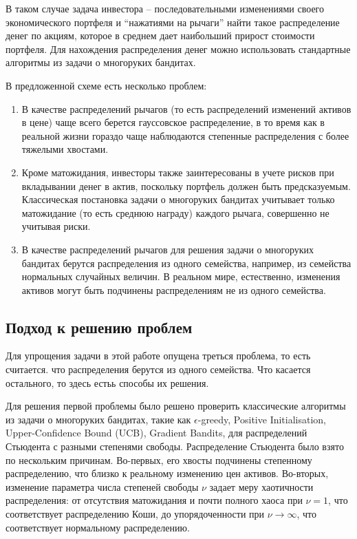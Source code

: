 В таком случае задача инвестора -- последовательными изменениями своего экономического портфеля и  ``нажатиями на рычаги'' найти такое распределение денег по акциям, которое в среднем дает наибольший прирост стоимости портфеля. Для нахождения распределения денег можно использовать стандартные алгоритмы из задачи о многоруких бандитах.

В предложенной схеме есть несколько проблем:
\begin{enumerate}
    \item В качестве распределений рычагов (то есть распределений изменений активов в цене) чаще всего берется гауссовское распределение, в то время как в реальной жизни гораздо чаще наблюдаются степенные распределения с более тяжелыми хвостами.
    \item Кроме матожидания, инвесторы также заинтересованы в учете рисков при вкладывании денег в актив, поскольку портфель должен быть предсказуемым. Классическая постановка задачи о многоруких бандитах учитывает только матожидание (то есть среднюю награду) каждого рычага, совершенно не учитывая риски.
    \item В качестве распределений рычагов для решения задачи о многоруких бандитах берутся распределения из одного семейства, например, из семейства нормальных случайных величин. В реальном мире, естественно, изменения активов могут быть подчинены распределениям не из одного семейства.
\end{enumerate}

\subsection{Подход к решению проблем}

Для упрощения задачи в этой работе опущена треться проблема, то есть считается. что распределения берутся из одного семейства. Что касается остального, то здесь естьь способы их решения.

Для решения первой проблемы было решено проверить классические алгоритмы из задачи о многоруких бандитах, такие как $\epsilon$-greedy, Positive Initialisation, Upper-Confidence Bound (UCB), Gradient Bandits, для распределений Стьюдента с разными степенями свободы. Распределение Стьюдента было взято по нескольким причинам. Во-первых, его хвосты подчинены степенному распределению, что близко к реальному изменению цен активов. Во-вторых, изменение параметра числа степеней свободы $\nu$ задает меру хаотичности распределения: от отсутствия матожидания и почти полного хаоса при $\nu=1$, что соответствует распределению Коши, до упорядоченности при $\nu \to \infty$, что соответствует нормальному распределению.

